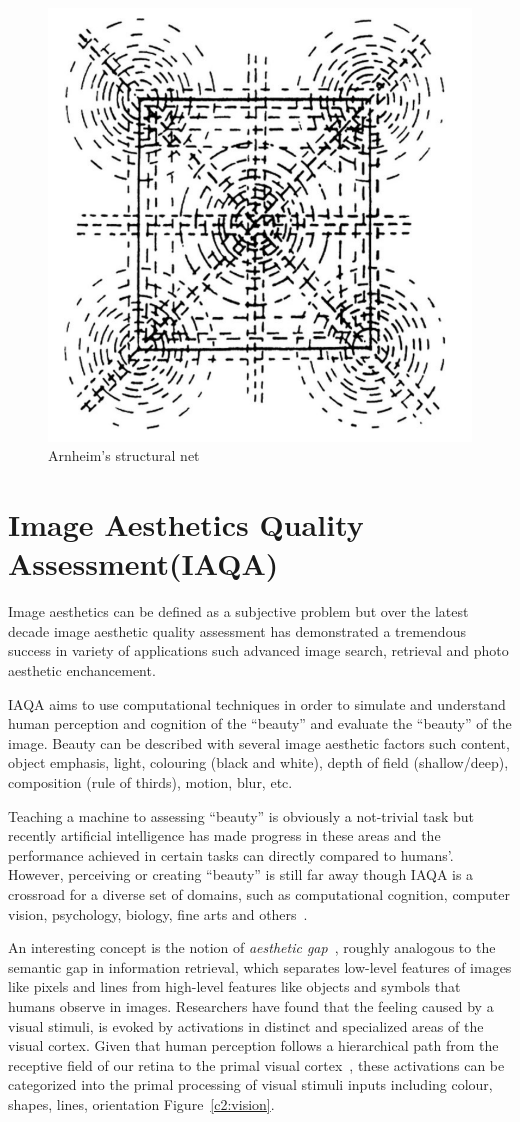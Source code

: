 \begin{figure}[ht!]
    \centering  
    \includegraphics[width=.35\textwidth]{figures/chap2/aesthetics/arnheim_net}
    \caption{Arnheim's structural net}
    \label{c2:arnheim_net}
\end{figure}

\section{Image Aesthetics Quality Assessment(IAQA)}
\label{c2:sec_iaqa}

Image aesthetics can be defined as a subjective problem but over the latest decade image aesthetic quality assessment has demonstrated a tremendous success in variety of applications such advanced image search, retrieval and photo aesthetic enchancement.

IAQA aims to use computational techniques in order to simulate and understand human perception and cognition of the ``beauty'' and evaluate the ``beauty'' of the image.
Beauty can be described with several image aesthetic factors such content, object emphasis, light, colouring (black and white), depth of field (shallow/deep), composition (rule of thirds), motion, blur, etc.

Teaching a machine to assessing ``beauty'' is obviously a not-trivial task but recently artificial intelligence has made progress in these areas and the performance achieved in certain tasks can directly compared to humans'.
However, perceiving or creating ``beauty'' is still far away though IAQA is a crossroad for a diverse set of domains, such as computational cognition, computer vision, psychology, biology, fine arts and others~\cite{yang2019comprehensive}.

An interesting concept is the notion of \textit{aesthetic gap}~\cite{goree2021}, roughly analogous to the semantic gap in information retrieval, which separates low-level features of images like pixels and lines from high-level features like objects and symbols that humans observe in images.
Researchers have found that the feeling caused by a visual stimuli, is evoked by activations in distinct and specialized areas of the visual cortex.
Given that human perception follows a hierarchical path from the receptive field of our retina to the primal visual cortex~\cite{marr1982vision}, these activations can be categorized into the primal processing of visual stimuli inputs including colour, shapes, lines, orientation Figure~\ref{c2:vision}.

